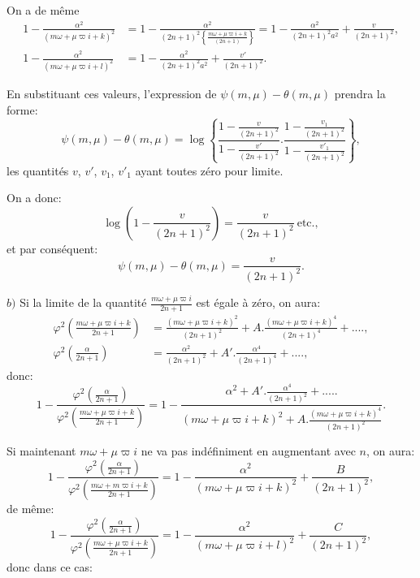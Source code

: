 \documentclass{article}
\begin{document}
On a de même
\[ \begin{aligned}1-\frac{\alpha^{2}}{(m\omega+\mu\varpi i+k)^{2}}&=1-\frac{\alpha^{2}}{(2n+1)^{2}\left\{\frac{m\omega+\mu\varpi i+k}{(2n+1)}\right\}}=1-\frac{\alpha^{2}}{(2n+1)^{2}a^{2}}+\frac{v}{(2n+1)^{2}},\\ 1-\frac{\alpha^{2}}{(m\omega+\mu\varpi i+l)^{2}}&=1-\frac{\alpha^{2}}{(2n+1)^{2}a^{2}}+\frac{v'}{(2n+1)^{2}}.\end{aligned} \]

En substituant ces valeurs, l'expression de $\psi(m,\mu)-\theta(m,\mu)$ prendra la forme:
\[ \psi(m,\mu)-\theta(m,\mu)=\log\left\{\frac{1-\frac{v}{(2n+1)^{2}}}{1-\frac{v'}{(2n+1)^{2}}}.\frac{1-\frac{v_{1}}{(2n+1)^{2}}}{1-\frac{v'_{1}}{(2n+1)^{2}}}\right\}, \]
les quantités $v$, $v'$, $v_{1}$, $v'_{1}$ ayant toutes zéro pour limite.

On a donc:
\[ \log\left(1-\frac{v}{(2n+1)^{2}}\right)=\frac{v}{(2n+1)^{2}}\ \text{etc.}, \]
et par conséquent:
\[ \psi(m,\mu)-\theta(m,\mu)=\frac{v}{(2n+1)^{2}}. \]

$b)$ Si la limite de la quantité $\frac{m\omega+\mu\varpi i}{2n+1}$ est égale à zéro, on aura:
\[ \begin{aligned}\varphi^{2}\left(\frac{m\omega+\mu\varpi i+k}{2n+1}\right)&=\frac{(m\omega+\mu\varpi i+k)^{2}}{(2n+1)^{2}}+A.\frac{(m\omega+\mu\varpi i+k)^{4}}{(2n+1)^{4}}+....,\\ \varphi^{2}\left(\frac{\alpha}{2n+1}\right)&=\frac{\alpha^{2}}{(2n+1)^{2}}+A'.\frac{\alpha^{4}}{(2n+1)^{4}}+....,\end{aligned} \]
donc:
\[ 1-\frac{\varphi^{2}\left(\frac{\alpha}{2n+1}\right)}{\varphi^{2}\left(\frac{m\omega+\mu\varpi i+k}{2n+1}\right)}=1-\frac{\alpha^{2}+A'.\frac{\alpha^{4}}{(2n+1)^{2}}+.....}{(m\omega+\mu\varpi i+k)^{2}+A.\frac{(m\omega+\mu\varpi i+k)^{4}}{(2n+1)^{2}}}. \]

Si maintenant $m\omega+\mu\varpi i$ ne va pas indéfiniment en augmentant avec $n$, on aura:
\[ 1-\frac{\varphi^{2}\left(\frac{\alpha}{2n+1}\right)}{\varphi^{2}\left(\frac{m\omega+m\varpi i+k}{2n+1}\right)}=1-\frac{\alpha^{2}}{(m\omega+\mu\varpi i+k)^{2}}+\frac{B}{(2n+1)^{2}}, \]
de même:
\[ 1-\frac{\varphi^{2}\left(\frac{\alpha}{2n+1}\right)}{\varphi^{2}\left(\frac{m\omega+\mu\varpi i+k}{2n+1}\right)}=1-\frac{\alpha^{2}}{(m\omega+\mu\varpi i+l)^{2}}+\frac{C}{(2n+1)^{2}}, \]
donc dans ce cas:
\end{document}
